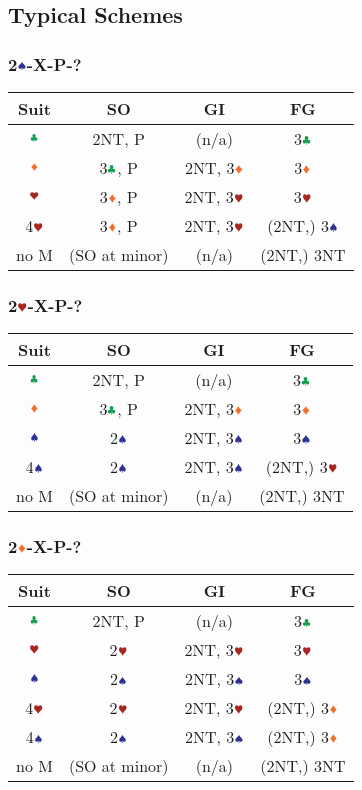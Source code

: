 \documentclass{article}
\newcommand*{\ccc}{\textcolor{ForestGreen}{\clubsuit}}
\newcommand*{\ddd}{\textcolor{Orange}{\vardiamondsuit}}
\newcommand*{\hhh}{\textcolor{Mahogany}{\varheartsuit}}
\newcommand*{\sss}{\textcolor{Blue}{\spadesuit}}
\begin{document}
\begin{multicols}{2}
\subsection{Typical Schemes}
\subsubsection{2$\sss$-X-P-?}
\begin{tabular}{c|c|c|c}
    \hline
    Suit & SO & GI & FG \\ \hline\hline
    $\ccc$ & 2NT, P & (n/a) & 3$\ccc$ \\ \hline
    $\ddd$ & 3$\ccc$, P & 2NT, 3$\ddd$ & 3$\ddd$ \\ \hline
    $\hhh$ & 3$\ddd$, P & 2NT, 3$\hhh$ & 3$\hhh$ \\ \hline
    4$\hhh$ & 3$\ddd$, P & 2NT, 3$\hhh$ & (2NT,) 3$\sss$ \\ \hline
    no M & (SO at minor) & (n/a) & (2NT,) 3NT \\ \hline
\end{tabular}

\subsubsection{2$\hhh$-X-P-?}
\begin{tabular}{c|c|c|c}
    \hline
    Suit & SO & GI & FG \\ \hline\hline
    $\ccc$ & 2NT, P & (n/a) & 3$\ccc$ \\ \hline
    $\ddd$ & 3$\ccc$, P & 2NT, 3$\ddd$ & 3$\ddd$ \\ \hline
    $\sss$ & 2$\sss$ & 2NT, 3$\sss$ & 3$\sss$ \\ \hline
    4$\sss$ & 2$\sss$ & 2NT, 3$\sss$ & (2NT,) 3$\hhh$ \\ \hline
    no M & (SO at minor) & (n/a) & (2NT,) 3NT \\ \hline
\end{tabular}

\subsubsection{2$\ddd$-X-P-?}
\begin{tabular}{c|c|c|c}
    \hline
    Suit & SO & GI & FG \\ \hline\hline
    $\ccc$ & 2NT, P & (n/a) & 3$\ccc$ \\ \hline
    $\hhh$ & 2$\hhh$ & 2NT, 3$\hhh$ & 3$\hhh$ \\ \hline
    $\sss$ & 2$\sss$ & 2NT, 3$\sss$ & 3$\sss$ \\ \hline
    4$\hhh$ & 2$\hhh$ & 2NT, 3$\hhh$ & (2NT,) 3$\ddd$ \\ \hline
    4$\sss$ & 2$\sss$ & 2NT, 3$\sss$ & (2NT,) 3$\ddd$ \\ \hline
    no M & (SO at minor) & (n/a) & (2NT,) 3NT \\ \hline
\end{tabular}


\end{multicols}
\end{document}
